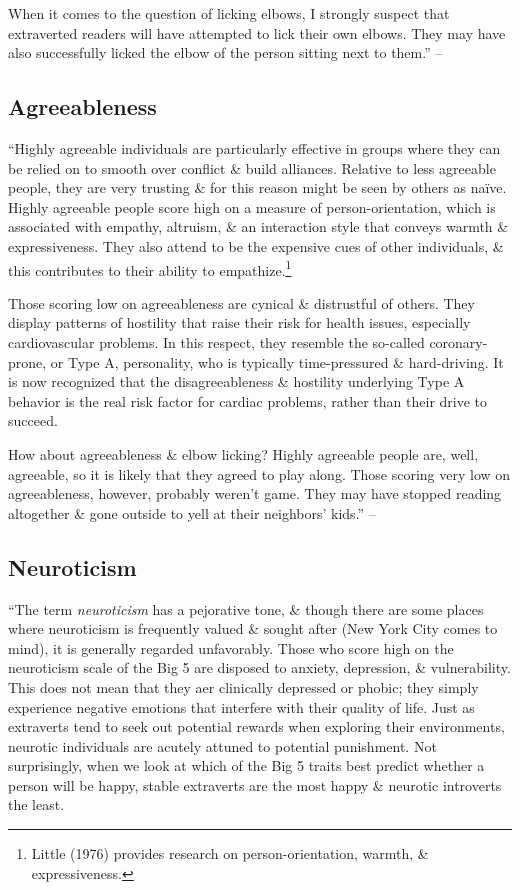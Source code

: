 \documentclass{article}
\numberwithin{equation}{section}
\begin{document}
When it comes to the question of licking elbows, I strongly suspect that extraverted readers will have attempted to lick their own elbows. They may have also successfully licked the elbow of the person sitting next to them.'' -- \cite[p. 18]{Little2017}

\subsection{Agreeableness}
``Highly agreeable individuals are particularly effective in groups where they can be relied on to smooth over conflict \& build alliances. Relative to less agreeable people, they are very trusting \& for this reason might be seen by others as na\"ive. Highly agreeable people score high on a measure of person-orientation, which is associated with empathy, altruism, \& an interaction style that conveys warmth \& expressiveness. They also attend to be the expensive cues of other individuals, \& this contributes to their ability to empathize.\footnote{Little (1976) provides research on person-orientation, warmth, \& expressiveness.}

Those scoring low on agreeableness are cynical \& distrustful of others. They display patterns of hostility that raise their risk for health issues, especially cardiovascular problems. In this respect, they resemble the so-called coronary-prone, or Type A, personality, who is typically time-pressured \& hard-driving. It is now recognized that the disagreeableness \& hostility underlying Type A behavior is the real risk factor for cardiac problems, rather than their drive to succeed.

How about agreeableness \& elbow licking? Highly agreeable people are, well, agreeable, so it is likely that they agreed to play along. Those scoring very low on agreeableness, however, probably weren't game. They may have stopped reading altogether \& gone outside to yell at their neighbors' kids.'' -- \cite[pp. 18--19]{Little2017}

\subsection{Neuroticism}
``The term \textit{neuroticism} has a pejorative tone, \& though there are some places where neuroticism is frequently valued \& sought after (New York City comes to mind), it is generally regarded unfavorably. Those who score high on the neuroticism scale of the Big 5 are disposed to anxiety, depression, \& vulnerability. This does not mean that they aer clinically depressed or phobic; they simply experience negative emotions that interfere with their quality of life. Just as extraverts tend to seek out potential rewards when exploring their environments, neurotic individuals are acutely attuned to potential punishment. Not surprisingly, when we look at which of the Big 5 traits best predict whether a person will be happy, stable extraverts are the most happy \& neurotic introverts the least.
\end{document}
